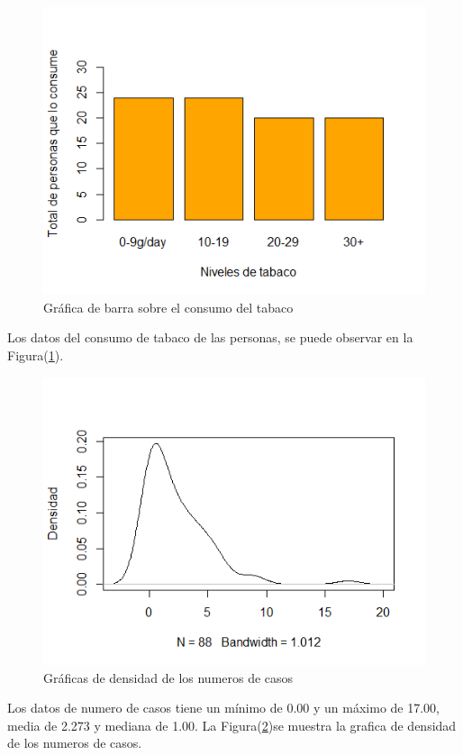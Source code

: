 \documentclass[12pt,a4paper]{article}
\begin{document}
\begin{figure}
	\centering
	\includegraphics[scale = 0.7]{tobgp.png}
	\caption{Gráfica de barra sobre el consumo del tabaco} \label{fig:tobgp}
\end{figure}
Los datos del consumo de tabaco de las personas, se puede observar en la Figura(\ref{fig:tobgp}).

\begin{figure}
	\centering
	\includegraphics[scale = 0.7]{ncasos.png}
	\caption{Gráficas de densidad de los numeros de casos} \label{fig:ncasos}
\end{figure}
Los datos de numero de casos tiene un mínimo de 0.00 y un máximo de 17.00, media de 2.273 y mediana de 1.00. La Figura(\ref{fig:ncasos})se muestra la grafica de densidad de los numeros de casos.
\end{document}
